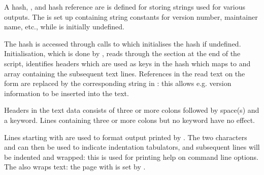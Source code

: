 \documentclass{article}
\begin{document}
A hash, , and hash reference  are is defined for storing strings used for various outputs. The  is set up containing string constants for version number, maintainer name, etc., while  is initially undefined.

The  hash is accessed through calls to  which initialises the hash if undefined. Initialisation, which is done by , reads through the  section at the end of the script, identifies headers which are used as keys in the hash which maps to and array containing the subsequent text lines. References in the read text on the form  are replaced by the corresponding string in : this allows e.g. version information to be inserted into the text.

Headers in the text data consists of three or more colons followed by space(s) and a keyword. Lines containing three or more colons but no keyword have no effect.

Lines starting with \code{\@} are used to format output printed by . The two characters  and  can then be used to indicate indentation tabulators, and subsequent lines will be indented and wrapped: this is used for printing help on command line options. The  also wraps text: the page with is set by .
\end{document}
